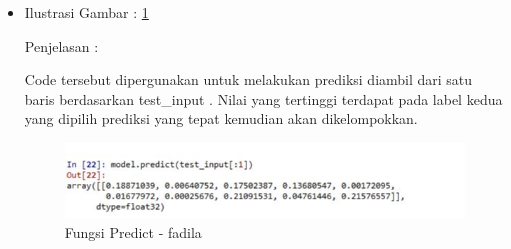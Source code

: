 \begin{enumerate}
\begin{itemize}
\par

\par
\par
\item Ilustrasi Gambar : \ref{fungsi-predict-fadila}
\par Penjelasan :
\par Code tersebut dipergunakan untuk melakukan prediksi diambil dari satu baris berdasarkan test\_input . Nilai yang tertinggi terdapat pada label kedua yang dipilih prediksi yang tepat kemudian akan dikelompokkan.
\par
\par
\begin{figure}[!hbtp]
\centering
\includegraphics[scale=0.2]{figures/fungsi-predict-fadila.jpg}
\caption{Fungsi Predict - fadila}
\label{fungsi-predict-fadila}
\end{figure}
\par
\par
\par
\par
\par
\par
\par
\par
\par
\end{itemize}
\end{enumerate}

\par
\par
\par
